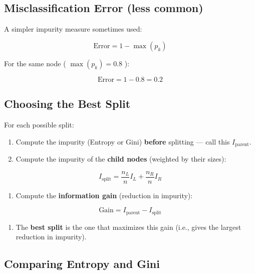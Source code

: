 \documentclass[
  letterpaper,
  DIV=11,
  numbers=noendperiod]{scrreprt}
\providecommand{\tightlist}{%
  \setlength{\itemsep}{0pt}\setlength{\parskip}{0pt}}\usepackage{longtable,booktabs,array}
\begin{document}
\subsection{Misclassification Error (less
common)}\label{misclassification-error-less-common}

A simpler impurity measure sometimes used:

\[
\text{Error} = 1 - \max(p_k)
\]

For the same node ( \(\max(p_k) = 0.8\) ):

\[
\text{Error} = 1 - 0.8 = 0.2
\]

\subsection{Choosing the Best Split}\label{choosing-the-best-split}

For each possible split:

\begin{enumerate}
\def\labelenumi{\arabic{enumi}.}
\item
  Compute the impurity (Entropy or Gini) \textbf{before} splitting ---
  call this \(I_{\text{parent}}\).
\item
  Compute the impurity of the \textbf{child nodes} (weighted by their
  sizes):
\end{enumerate}

\[
I_{\text{split}} = \frac{n_L}{n} I_L + \frac{n_R}{n} I_R
\]

\begin{enumerate}
\def\labelenumi{\arabic{enumi}.}
\setcounter{enumi}{2}
\tightlist
\item
  Compute the \textbf{information gain} (reduction in impurity):
\end{enumerate}

\[
\text{Gain} = I_{\text{parent}} - I_{\text{split}}
\]

\begin{enumerate}
\def\labelenumi{\arabic{enumi}.}
\setcounter{enumi}{3}
\tightlist
\item
  The \textbf{best split} is the one that maximizes this gain (i.e.,
  gives the largest reduction in impurity).
\end{enumerate}

\subsection{Comparing Entropy and
Gini}\label{comparing-entropy-and-gini}
\end{document}
